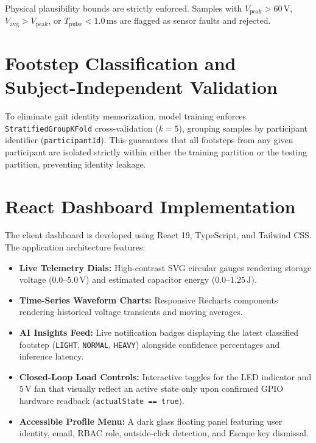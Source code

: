 Physical plausibility bounds are strictly enforced. Samples with $V_{\text{peak}} > 60\,\text{V}$, $V_{\text{avg}} > V_{\text{peak}}$, or $T_{\text{pulse}} < 1.0\,\text{ms}$ are flagged as sensor faults and rejected.

\section{Footstep Classification and Subject-Independent Validation}
To eliminate gait identity memorization, model training enforces \texttt{Stratified}\-\texttt{GroupKFold} cross-validation ($k = 5$), grouping samples by participant identifier (\texttt{participantId}). This guarantees that all footsteps from any given participant are isolated strictly within either the training partition or the testing partition, preventing identity leakage.

\section{React Dashboard Implementation}
The client dashboard is developed using React 19, TypeScript, and Tailwind CSS. The application architecture features:
\begin{itemize}
    \item \textbf{Live Telemetry Dials:} High-contrast SVG circular gauges rendering storage voltage ($0.0\text{--}5.0\,\text{V}$) and estimated capacitor energy ($0.0\text{--}1.25\,\text{J}$).
    \item \textbf{Time-Series Waveform Charts:} Responsive Recharts components rendering historical voltage transients and moving averages.
    \item \textbf{AI Insights Feed:} Live notification badges displaying the latest classified footstep (\texttt{LIGHT}, \texttt{NORMAL}, \texttt{HEAVY}) alongside confidence percentages and inference latency.
    \item \textbf{Closed-Loop Load Controls:} Interactive toggles for the LED indicator and 5\,V fan that visually reflect an active state only upon confirmed GPIO hardware readback (\texttt{actualState == true}).
    \item \textbf{Accessible Profile Menu:} A dark glass floating panel featuring user identity, email, RBAC role, outside-click detection, and Escape key dismissal.
\end{itemize}

